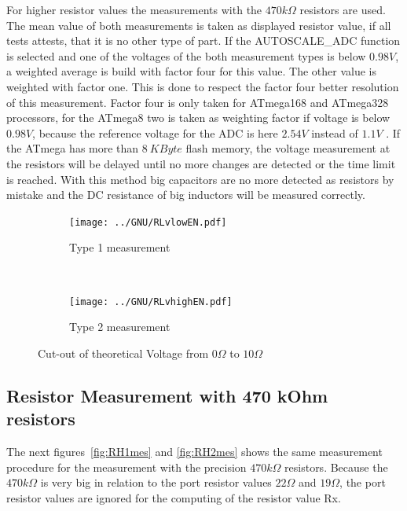 For higher resistor values the measurements with the \(470k\Omega\) resistors are used. The mean value of both
measurements is taken as displayed resistor value, if all tests attests, that it is no other type of part.
If the AUTOSCALE\_ADC function is selected and one of the voltages of the both measurement types is below \(0.98V\),
a weighted average is build with factor four for this value. The other value is weighted with factor one.
This is done to respect the factor four better resolution of this measurement. Factor four is only taken for 
ATmega168 and ATmega328 processors, for the ATmega8 two is taken as weighting factor if voltage is below \(0.98V\),
because the reference voltage for the ADC is here \(2.54V\) instead of \(1.1V\) .
If the ATmega has more than \(8~KByte\) flash memory, the voltage measurement at the resistors will be delayed until
no more changes are detected or the time limit is reached.
With this method big capacitors are no more detected as resistors by mistake and
the DC resistance of big inductors will be measured correctly.


\begin{figure}[H]
  \begin{subfigure}[b]{.5\textwidth}
    \centering
    \texttt{[image: ../GNU/RLvlowEN.pdf]}
    \caption{Type 1 measurement}
    \label{fig:RLvlow}
  \end{subfigure}
  ~
  \begin{subfigure}[b]{.5\textwidth}
    \centering
    \texttt{[image: ../GNU/RLvhighEN.pdf]}
    \caption{Type 2 measurement}
    \label{fig:RLvhigh}
  \end{subfigure}
  \caption{Cut-out of theoretical Voltage from \(0\Omega\) to \(10\Omega\)}
\end{figure}


\subsection{Resistor Measurement with 470 kOhm resistors}
The next figures~\ref{fig:RH1mes} and \ref{fig:RH2mes} shows the same measurement procedure for the
measurement with the precision \(470k\Omega\) resistors. Because the \(470k\Omega\) is very big in relation
to the port resistor values \(22\Omega\) and \(19\Omega\), the port resistor values are ignored for the computing
of the resistor value Rx.

